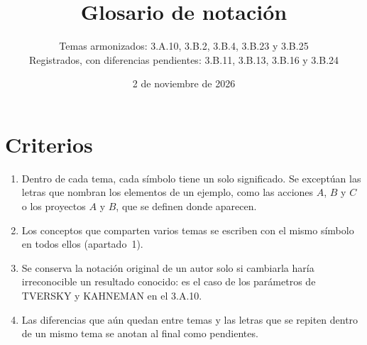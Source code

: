 \documentclass[10pt,a4paper]{article}
\title{Glosario de notación}
\author{Temas armonizados: 3.A.10, 3.B.2, 3.B.4, 3.B.23 y 3.B.25\\Registrados, con diferencias pendientes: 3.B.11, 3.B.13, 3.B.16 y 3.B.24}
\date{2 de noviembre de 2026}
\begin{document}
\maketitle

\section*{Criterios}
\begin{enumerate}
    \item Dentro de cada tema, cada símbolo tiene un solo significado. Se exceptúan las letras que nombran los elementos de un ejemplo, como las acciones $A$, $B$ y $C$ o los proyectos $A$ y $B$, que se definen donde aparecen.
    \item Los conceptos que comparten varios temas se escriben con el mismo símbolo en todos ellos (apartado~1).
    \item Se conserva la notación original de un autor solo si cambiarla haría irreconocible un resultado conocido: es el caso de los parámetros de TVERSKY y KAHNEMAN en el 3.A.10.
    \item Las diferencias que aún quedan entre temas y las letras que se repiten dentro de un mismo tema se anotan al final como pendientes.
\end{enumerate}
\end{document}
